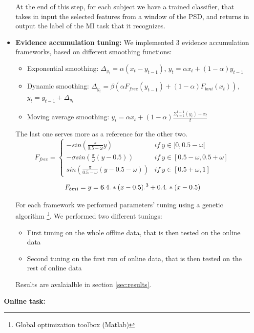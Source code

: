 \begin{itemize}
At the end of this step, for each subject we have a trained classifier, that takes in input the selected features from a window of the PSD, and returns in output the label of the MI task that it recognizes. \\
\item \textbf{Evidence accumulation tuning:} We implemented 3 evidence accumulation frameworks, based on different smoothing functions:
	\begin{itemize}
		\item Exponential smoothing: $\Delta_{y_t} = \alpha  (x_t - y_{t-1})$, $y_t = \alpha x_t +(1 - \alpha) y_{t-1}$
		\item Dynamic smoothing: $\Delta_{y_t} = \beta  (\alpha F_{free}(y_{t-1}) + (1 - \alpha) F_{bmi}(x_t))$, $y_t = y_{t-1} + \Delta_{y_t}$
		\item Moving average smoothing: $y_t = \alpha x_t +(1 - \alpha) \frac{\Sigma_{i=1}^{t-1}(y_i) + x_t}{t} $
	\end{itemize}

The last one serves more as a reference for the other two. \\

\[ F_{free} = 
	\begin{cases} 
		-sin(\frac{\pi}{0.5-\omega} y) & if \ y \in [0, 0.5-\omega [ \\ 
		-\sigma sin(\frac{\pi}{\omega}(y-0.5))  & if \ y \in [0.5 - \omega, 0.5 + \omega ] \\ 
		sin(\frac{\pi}{0.5-\omega} (y -0.5 -\omega ))  & if \ y \in [0.5 + \omega, 1]
	\end{cases} 
\label{eq:f_free}
\]

\[ F_{bmi} = y = 6.4 .* (x - 0.5).^3 + 0.4 .* (x - 0.5) \\ \label{eq:f_bmi}\]


For each framework we performed parameters' tuning using a genetic algorithm \footnote{Global optimization toolbox (Matlab)}. We performed two different tunings:
	\begin{itemize}
		\item First tuning on the whole offline data, that is then tested on the online data
		\item Second tuning on the first run of online data, that is then tested on the rest of online data
	\end{itemize}
Results are avalaialble in section \ref{sec:results}.
\end{itemize}

\noindent
{\Large\textbf{Online task:}}

